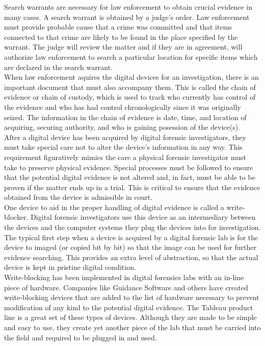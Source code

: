 \documentclass[12pt]{article}
\begin{document}
Search warrants are necessary for law enforcement to obtain crucial evidence in many
cases.  A search warrant is obtained by a judge's order.  Law enforcement must 
provide probable cause that a crime 
was committed and that items connected to that crime are likely to be found 
in the place specified by the warrant.  The judge will review the matter and if
they are in agreement, will authorize law enforcement to search a particular location
for specific items which are declared in the search warrant.\\

When law enforcement aquires the digital devices for an investigation, there is
an important document that must also accompany them.  This is called the chain of
evidence or chain of custody, which is used to track who currently has control
of the evidence and
who has had control chronologically since it was originally seized.
The information in the chain
of evidence is date, time, and location of acquiring, securing authority, and who is
gaining posession of the device(s).\\

After a digital device has been acquired by digital forensic investigators, they
must take special care not to alter the device's information in any way.  This 
requirement figuratively mimics the care a physical forensic investigator must
take to preserve physical evidence.  Special processes must be followed to ensure
that the potential digital evidence is not altered and, in fact, must be able to 
be proven if the matter ends up in a trial.  This is critical to ensure that the
evidence obtained from the device is admissible in court.\\

One device to aid in the proper handling of digital evidence is called a
write-blocker.  Digital forensic investigators use this device as an intermediary
between the devices and the computer systems they plug the devices into for
investigation.  The typical first step when a device is acquired by a digital
forensic lab is for the device to imaged (or copied bit by bit) so that the
image can be used for further evidence searching.  This provides an extra level of
abstraction, so that the actual device is kept in pristine digital condition.\\

Write-blocking has been implemented in digital forensics labs with an in-line 
piece of hardware.  Companies like Guidance Software and others have created
write-blocking devices that are added to the list of hardware necessary to 
prevent modification of any kind to the potential digital evidence.  The Tableau
product line is a great set of these types of devices.  Although they are made
to be simple and easy to use, they create yet another piece of the lab that must
be carried into the field and required to be plugged in and used.\\
\end{document}
